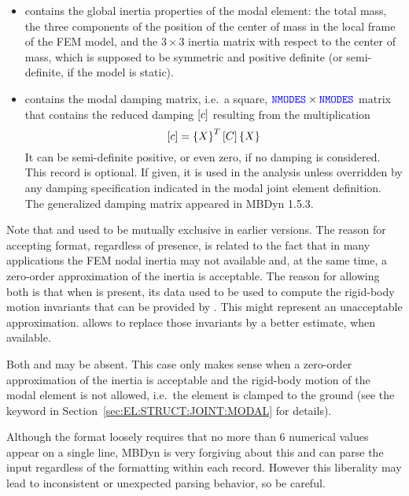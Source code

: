 \begin{itemize}
\item {} contains the global inertia properties
of the modal element: the total mass, the three components 
of the position of the center of mass in the local frame
of the FEM model, and the $3\times{3}$ inertia matrix
with respect to the center of mass, which is supposed
to be symmetric and positive definite (or semi-definite,
if the model is static).

\item {} contains the modal damping matrix,
i.e.\ a square, $\textcolor{blue}{\texttt{NMODES}} \times \textcolor{blue}{\texttt{NMODES}}$ matrix that contains
the reduced damping $\left[ c \right]$ resulting from the multiplication
\begin{equation}
	\left[ c \right] = \left\{ X \right\}^T \left[ C \right] \left\{ X \right\}
\end{equation}
It can be semi-definite positive, or even zero, if no damping is considered.
This record is optional.
If given, it is used in the analysis unless overridden by any damping
specification indicated in the modal joint element definition.
The generalized damping matrix appeared in MBDyn 1.5.3.

\end{itemize}

Note that  and 
used to be mutually exclusive in earlier versions.
The reason for accepting  format,
regardless of  presence, is related
to the fact that in many applications the FEM nodal inertia
may not available and, at the same time, a zero-order approximation
of the inertia is acceptable.
The reason for allowing both is that when 
is present, its data used to be used to compute the rigid-body
motion invariants that can be provided by .
This might represent an unacceptable approximation.
 allows to replace those invariants
by a better estimate, when available.

Both  and  may be absent.
This case only makes sense when a zero-order approximation
of the inertia is acceptable and the rigid-body motion
of the modal element is not allowed, i.e.\ the element is clamped
to the ground (see the keyword 
in Section~\ref{sec:EL:STRUCT:JOINT:MODAL} for details).


Although the format loosely requires that no more than 6 numerical values 
appear on a single line, MBDyn is very forgiving about this and can parse
the input regardless of the formatting within each record.
However this liberality may lead to inconsistent or unexpected parsing
behavior, so be careful.



